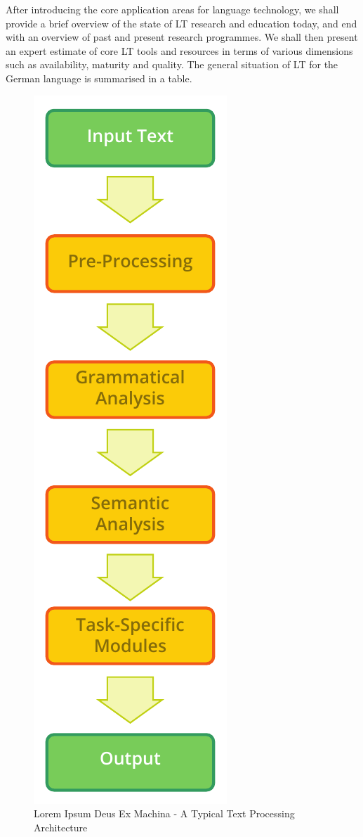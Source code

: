 \documentclass[]{../../metanetpaper}
\begin{document}
\begin{Parallel}[c]{80mm}{80mm}
{    After introducing the core application areas for language technology, we shall provide a brief overview of the state of LT research and education today, and end with an overview of past and present research programmes. We shall then present an expert estimate of core LT tools and resources in terms of various dimensions such as availability, maturity and quality. The general situation of LT for the German language is summarised in a table.
  }
  \ParallelPar
  \clearpage
\begin{figure}[h!]
\center
\includegraphics[scale=0.6]{../_media/text_processing_app_architecture}\\
\textsf{Lorem Ipsum Deus Ex Machina - A Typical Text Processing Architecture}
 \end{figure}

\end{Parallel}
\end{document}
